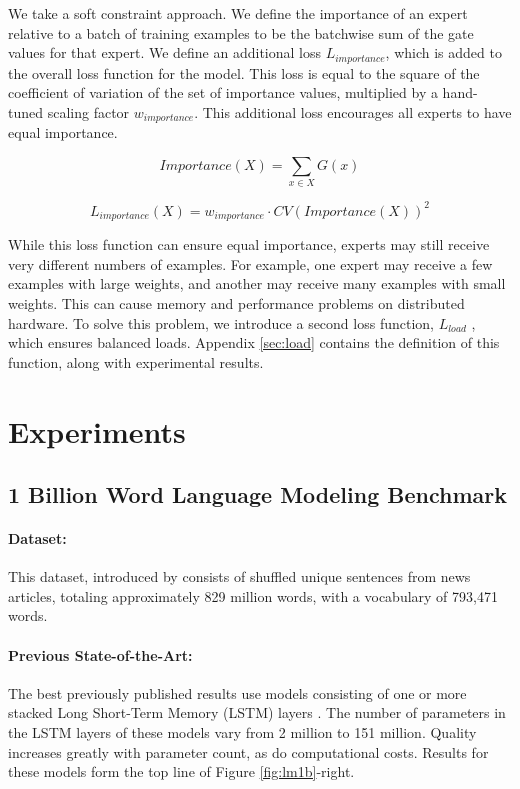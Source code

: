 \documentclass{article} %
\begin{document}
We take a soft constraint approach.  We define the importance of an expert relative to a batch of training examples to be the batchwise sum of the gate values for that expert.  We define an additional loss $L_{importance}$, which is added to the overall loss function for the model.  This loss is equal to the square of the coefficient of variation of the set of importance values, multiplied by a hand-tuned scaling factor $w_{importance}$.  This additional loss encourages all experts to have equal importance.

\begin{equation}\label{eq:gateloss}
Importance(X) = \sum_{x \in X}G(x)
\end{equation}

\begin{equation}\label{eq:importanceloss}
L_{importance}(X) = w_{importance} \cdot CV(Importance(X))^2
\end{equation}

While this loss function can ensure equal importance, experts may still receive very different numbers of examples.  For example, one expert may receive a few examples with large weights, and another may receive many examples with small weights.  This can cause memory and performance problems on distributed hardware.  To solve this problem, we introduce a second loss function, $L_{load}$ , which ensures balanced loads.  Appendix \ref{sec:load} contains the definition of this function, along with experimental results.

\section{Experiments}


\subsection{1 Billion Word Language Modeling Benchmark}\label{sec:lm}

\paragraph{Dataset:} This dataset, introduced by \citep{chelba2013one} consists of shuffled unique sentences from news articles, totaling approximately 829 million words, with a vocabulary of 793,471 words.

\paragraph{Previous State-of-the-Art:} The best previously published results \citep{RafalNoam16} use models consisting of one or more stacked Long Short-Term Memory (LSTM) layers \citep{Hochreiter:1997:LSM,Gers:2000:LFC}.  The number of parameters in the LSTM layers of these models vary from 2 million to 151 million.  Quality increases greatly with parameter count, as do computational costs.  Results for these models form the top line of Figure \ref{fig:lm1b}-right.
\end{document}
